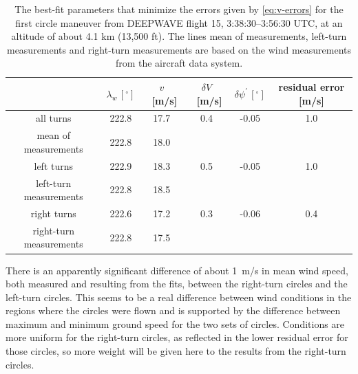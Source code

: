 \documentclass[12pt,twoside,english]{article}\usepackage[]{graphicx}\usepackage[]{color}
\providecommand{\tabularnewline}{\\}
\let\OrgIndex\index
\renewcommand*{\index}[1]{\OrgIndex{#1}}
\begin{document}
{{\begin{center}
\begin{table}[H] 
\begin{centering}
\begin{tabular}{cccccc}
\toprule   & $\lambda_w\,[^{\circ}]$  & $v$~{[}m/s{]}  & $\delta V$~{[}m/s{]}  & $\delta\psi^{\prime}\,[^{\circ}]$  & residual error {[}m/s{]}\tabularnewline 
\midrule 
\midrule  all turns & 222.8 & 17.7 & 0.4 & -0.05 & 1.0\tabularnewline 
\midrule  mean of measurements & 222.8 & 18.0 &  &  & \tabularnewline 
\midrule  left turns & 222.9 & 18.3 & 0.5 & -0.05 & 1.0\tabularnewline 
\midrule  left-turn measurements & 222.8 & 18.5 &  & & \tabularnewline 
\midrule  right turns & 222.6 & 17.2 & 0.3 & -0.06 & 0.4\tabularnewline 
\midrule  right-turn measurements & 222.8 & 17.5 &  & & \tabularnewline 
\bottomrule 
\end{tabular}
\par\end{centering}

\protect\caption[The best-fit parameters that minimize the errors given by \eqref{eq:v-errors} for the first circle maneuver from DEEPWAVE flight 15.]{The best-fit parameters that minimize the errors given by \eqref{eq:v-errors} for the first circle maneuver from DEEPWAVE flight 15, 3:38:30--3:56:30 UTC, at an altitude of about 4.1 km (13,500 ft). The lines \textquotedbl{}mean of measurements\textquotedbl{}, \textquotedbl{}left-turn measurements\textquotedbl{} and \textquotedbl{}right-turn measurements\textquotedbl{} are based on the wind measurements from the aircraft data system.\label{tab:GSmin}}
\end{table}

\par\end{center}

There is an apparently significant difference of about 1~m/s in mean wind speed, both measured and resulting from the fits, between the right-turn circles and the left-turn circles. This seems to be a real difference between wind conditions in the regions where the circles were flown and is supported by the difference between maximum and minimum ground speed for the two sets of circles. Conditions are more uniform for the right-turn circles, as reflected in the lower residual error for those circles, so more weight will be given here to the results from the right-turn circles. 

}}
\end{document}
